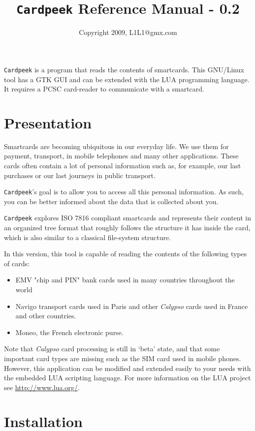 \documentclass[11pt]{article}
\title{\texttt{Cardpeek} Reference Manual - 0.2}
\author{Copyright 2009, L1L1@gmx.com}
\begin{document}
\maketitle

\texttt{Cardpeek} is a program that reads the contents of smartcards. 
This GNU/Linux tool has a GTK GUI and can be extended with the LUA programming language. 
It requires a PCSC card-reader to communicate with a smartcard.

\section{Presentation}

Smartcards are becoming ubiquitous in our everyday life. 
We use them for payment, transport, in mobile telephones and many other applications.
These cards often contain a lot of personal information such as, for example, our last purchases or our last journeys in public transport.

\texttt{Cardpeek}'s goal is to allow you to access all this personal information. As such, you can be better informed about the data that is collected about you.

\texttt{Cardpeek} explores ISO 7816 compliant smartcards and represents their content in an organized tree format that roughly follows the structure it has inside the card, which is also similar to a classical file-system structure.

In this version, this tool is capable of reading the contents of the following types of cards:
\begin{itemize}
\item{EMV "chip and PIN" bank cards used in many countries throughout the world}
\item{Navigo transport cards used in Paris and other \textit{Calypso} cards used in France and other countries.}
\item{Moneo, the French electronic purse.}
\end{itemize}

Note that \textit{Calypso} card processing is still in `beta' state, 
and that some important card types are missing such as the SIM card used in mobile phones.
However, this application can be modified and extended easily to your needs with the embedded LUA scripting language.
For more information on the LUA project see \url{http://www.lua.org/}.

\section{Installation}
\end{document}
